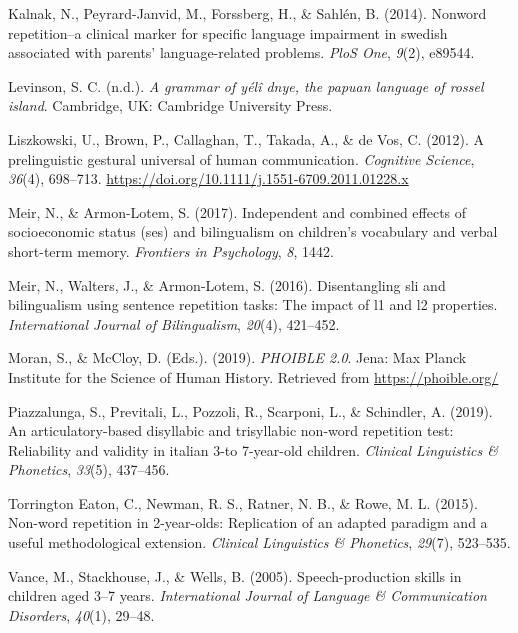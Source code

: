 \documentclass[english,,man,floatsintext]{apa6}
\begin{document}
\leavevmode\hypertarget{ref-kalnak2014nonword}{}%
Kalnak, N., Peyrard-Janvid, M., Forssberg, H., \& Sahlén, B. (2014). Nonword repetition--a clinical marker for specific language impairment in swedish associated with parents' language-related problems. \emph{PloS One}, \emph{9}(2), e89544.

\leavevmode\hypertarget{ref-levinsoninprepydgrammar}{}%
Levinson, S. C. (n.d.). \emph{A grammar of yélî dnye, the papuan language of rossel island}. Cambridge, UK: Cambridge University Press.

\leavevmode\hypertarget{ref-liszkowski2012prelinguistic}{}%
Liszkowski, U., Brown, P., Callaghan, T., Takada, A., \& de Vos, C. (2012). A prelinguistic gestural universal of human communication. \emph{Cognitive Science}, \emph{36}(4), 698--713. \url{https://doi.org/10.1111/j.1551-6709.2011.01228.x}

\leavevmode\hypertarget{ref-meir2017independent}{}%
Meir, N., \& Armon-Lotem, S. (2017). Independent and combined effects of socioeconomic status (ses) and bilingualism on children's vocabulary and verbal short-term memory. \emph{Frontiers in Psychology}, \emph{8}, 1442.

\leavevmode\hypertarget{ref-meir2016disentangling}{}%
Meir, N., Walters, J., \& Armon-Lotem, S. (2016). Disentangling sli and bilingualism using sentence repetition tasks: The impact of l1 and l2 properties. \emph{International Journal of Bilingualism}, \emph{20}(4), 421--452.

\leavevmode\hypertarget{ref-phoible}{}%
Moran, S., \& McCloy, D. (Eds.). (2019). \emph{PHOIBLE 2.0}. Jena: Max Planck Institute for the Science of Human History. Retrieved from \url{https://phoible.org/}

\leavevmode\hypertarget{ref-piazzalunga2019articulatory}{}%
Piazzalunga, S., Previtali, L., Pozzoli, R., Scarponi, L., \& Schindler, A. (2019). An articulatory-based disyllabic and trisyllabic non-word repetition test: Reliability and validity in italian 3-to 7-year-old children. \emph{Clinical Linguistics \& Phonetics}, \emph{33}(5), 437--456.

\leavevmode\hypertarget{ref-torrington2015non}{}%
Torrington Eaton, C., Newman, R. S., Ratner, N. B., \& Rowe, M. L. (2015). Non-word repetition in 2-year-olds: Replication of an adapted paradigm and a useful methodological extension. \emph{Clinical Linguistics \& Phonetics}, \emph{29}(7), 523--535.

\leavevmode\hypertarget{ref-vance2005speech}{}%
Vance, M., Stackhouse, J., \& Wells, B. (2005). Speech-production skills in children aged 3--7 years. \emph{International Journal of Language \& Communication Disorders}, \emph{40}(1), 29--48.
\end{document}
